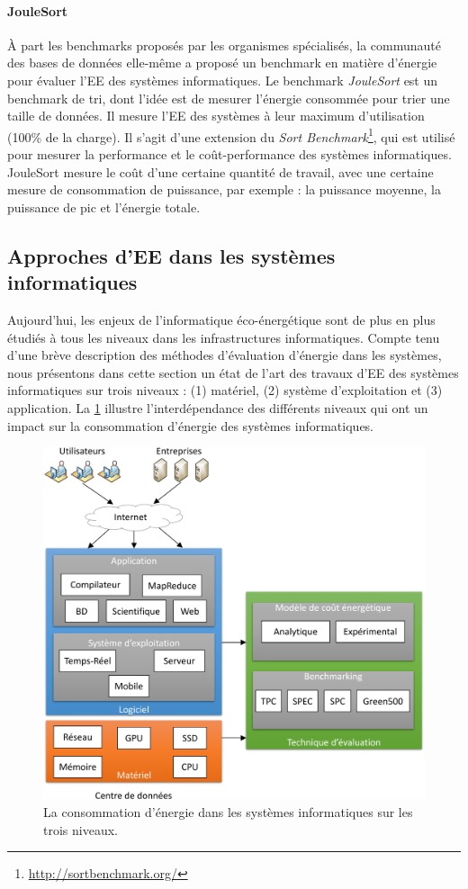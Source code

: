 \paragraph{JouleSort}
À part les benchmarks proposés par les organismes spécialisés, la communauté des bases de données elle-même a proposé un benchmark en matière d'énergie pour évaluer l'EE des systèmes informatiques. Le benchmark \textit{JouleSort} \cite{Rivoire07} est un benchmark de tri, dont l'idée est de mesurer l'énergie consommée pour trier une taille de données. Il mesure l'EE des systèmes à leur maximum d'utilisation (100\% de la charge). Il s'agit d'une extension du \textit{Sort Benchmark}\footnote{\url{http://sortbenchmark.org/}}, qui est utilisé pour mesurer la performance et le coût-performance des systèmes informatiques. JouleSort mesure le coût d'une certaine quantité de travail, avec une certaine mesure de consommation de puissance, par exemple : la puissance moyenne, la puissance de pic et l'énergie totale.

\subsection{Approches d'EE dans les systèmes informatiques}
Aujourd'hui, les enjeux de l'informatique éco-énergétique sont de plus en plus étudiés à tous les niveaux dans les infrastructures informatiques. Compte tenu d'une brève description des méthodes d'évaluation d'énergie dans les systèmes, nous présentons dans cette section un état de l'art des travaux d'EE des systèmes informatiques sur trois niveaux : (1) matériel, (2) système d'exploitation et (3) application. La \ref{fig:ee-it} illustre l'interdépendance des différents niveaux qui ont un impact sur la consommation d'énergie des systèmes informatiques.

\begin{figure}
 \centering
 \includegraphics[scale=0.45]{chapitre3/chap3Fig/ee-it.pdf}
 \caption{La consommation d'énergie dans les systèmes informatiques sur les trois niveaux.}
 \label{fig:ee-it}
\end{figure}

